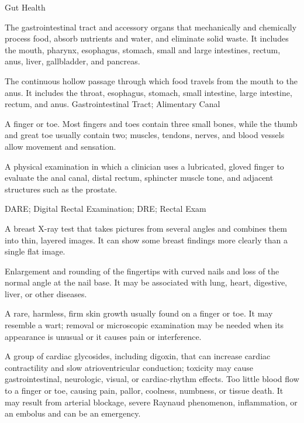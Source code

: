 \synonyms
Gut Health

 The gastrointestinal tract and accessory organs that mechanically and chemically process food, absorb nutrients and water, and eliminate solid waste. It includes the mouth, pharynx, esophagus, stomach, small and large intestines, rectum, anus, liver, gallbladder, and pancreas.

 The continuous hollow passage through which food travels from the mouth to the anus. It includes the throat, esophagus, stomach, small intestine, large intestine, rectum, and anus.
\synonyms
Gastrointestinal Tract; Alimentary Canal

 A finger or toe. Most fingers and toes contain three small bones, while the thumb and great toe usually contain two; muscles, tendons, nerves, and blood vessels allow movement and sensation.

 A physical examination in which a clinician uses a lubricated, gloved finger to evaluate the anal canal, distal rectum, sphincter muscle tone, and adjacent structures such as the prostate.

\synonyms
DARE; Digital Rectal Examination; DRE; Rectal Exam

 A breast X-ray test that takes pictures from several angles and combines them into thin, layered images. It can show some breast findings more clearly than a single flat image.

 Enlargement and rounding of the fingertips with curved nails and loss of the normal angle at the nail base. It may be associated with lung, heart, digestive, liver, or other diseases.

 A rare, harmless, firm skin growth usually found on a finger or toe. It may resemble a wart; removal or microscopic examination may be needed when its appearance is unusual or it causes pain or interference.

 A group of cardiac glycosides, including digoxin, that can increase cardiac contractility and slow atrioventricular conduction; toxicity may cause gastrointestinal, neurologic, visual, or cardiac-rhythm effects.
 Too little blood flow to a finger or toe, causing pain, pallor, coolness, numbness, or tissue death. It may result from arterial blockage, severe Raynaud phenomenon, inflammation, or an embolus and can be an emergency.

